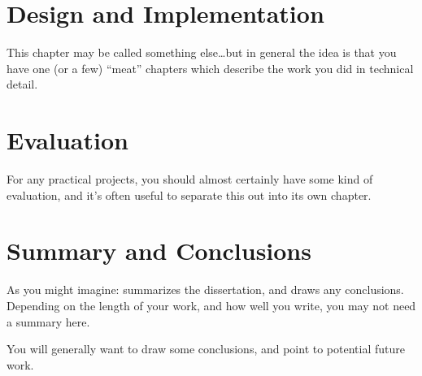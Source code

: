 \documentclass[a4paper,12pt,twoside,openright]{report}
\begin{document}
\chapter{Design and Implementation}

This chapter may be called something else\ldots but in general
the idea is that you have one (or a few) ``meat'' chapters which
describe the work you did in technical detail.


\chapter{Evaluation}

For any practical projects, you should almost certainly have
some kind of evaluation, and it's often useful to separate
this out into its own chapter.


\chapter{Summary and Conclusions}

As you might imagine: summarizes the dissertation, and draws
any conclusions. Depending on the length of your work, and
how well you write, you may not need a summary here.

You will generally want to draw some conclusions, and point
to potential future work.




\appendix
\singlespacing


%
\end{document}
